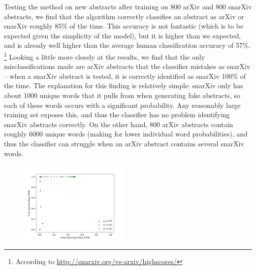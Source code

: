 \documentclass{article}
\begin{document}
Testing the method on new abstracts after training on 800 arXiv and 800 snarXiv abstracts, we find that the algorithm correctly classifies an abstract as arXiv or snarXiv roughly 85\% of the time.
This accuracy is not fantastic (which is to be expected given the simplicity of the model), but it is higher than we expected, and is already well higher than the average human classification accuracy of 57\%.%
\footnote{According to \url{http://snarxiv.org/vs-arxiv/highscores/}}
Looking a little more closely at the results, we find that the only misclassifications made are arXiv abstracts that the classifier mistakes as snarXiv -- when a snarXiv abstract is tested, it is correctly identified as snarXiv 100\% of the time.
The explanation for this finding is relatively simple: snarXiv only has about 1000 unique words that it pulls from when generating fake abstracts, so each of these words occurs with a significant probability.
Any reasonably large training set exposes this, and thus the classifier has no problem identifying snarXiv abstracts correctly.
On the other hand, 800 arXiv abstracts contain roughly 6000 unique words (making for lower individual word probabilities), and thus the classifier can struggle when an arXiv abstract contains several snarXiv words.




\begin{figure}[!htbp]
\centering
	\includegraphics[width=0.48\textwidth]{../figures/FDR_TPR_plot.png}
\end{figure}
\end{document}
